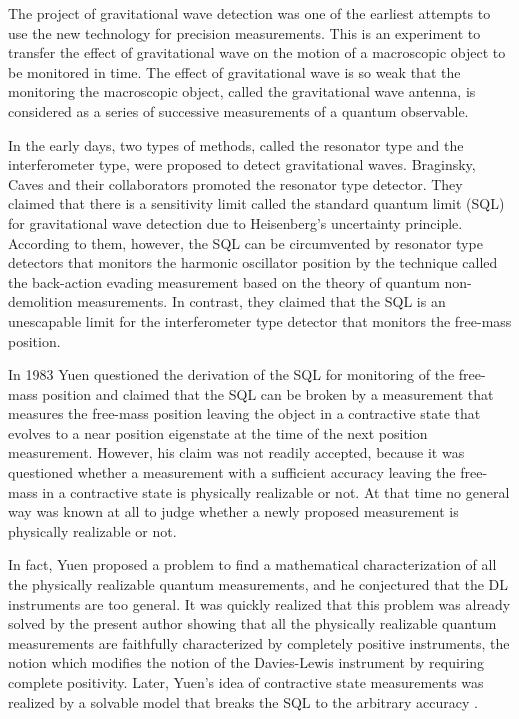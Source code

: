 \documentclass[graybox]{svmult}
\begin{document}
The project of gravitational wave detection was one of the earliest 
attempts to use the new technology for precision measurements.
This is an experiment to transfer the effect of gravitational wave 
on the motion of a macroscopic object to be monitored in time.
The effect of gravitational wave is so weak that the monitoring 
the macroscopic object, called the gravitational wave antenna, is
considered as a series of successive measurements of 
a quantum observable.

In the early days,  two types of methods, called the resonator type 
and the interferometer type, were proposed to detect gravitational waves.
Braginsky, Caves and their collaborators \cite{BVT80,CTDSZ80} promoted 
the resonator type detector.
They claimed that there is a sensitivity limit called the standard
quantum limit (SQL) for gravitational wave detection due to Heisenberg's
uncertainty principle.  According to them, however, the SQL can be circumvented 
by resonator type detectors that monitors the harmonic oscillator position
by the technique called the back-action evading measurement
based on the theory of quantum non-demolition measurements.
In contrast, they claimed that the SQL is an unescapable limit 
for the interferometer type detector that monitors the free-mass position.

In 1983 Yuen \cite{Yue83} questioned the derivation
of the SQL for monitoring of the free-mass position and claimed
that the SQL can be broken by a measurement 
that measures the free-mass position leaving the object in a
contractive state that evolves to a near position eigenstate 
at the time of the next position measurement.
However, his claim was not readily accepted, because it was questioned 
whether a measurement with a sufficient accuracy
leaving the free-mass in a contractive state is physically realizable or not.
At that time no general way was known at all to judge whether 
a newly proposed measurement is physically realizable or not.

In fact,  Yuen \cite{Yue87} proposed a problem to find a mathematical 
characterization of all the physically realizable quantum measurements,
and he conjectured that the DL instruments are too general.
It was quickly realized that this problem was already solved 
by the present author \cite{84QC} showing that all the physically realizable
quantum measurements are faithfully characterized by completely
positive instruments, the notion which modifies the notion of the
Davies-Lewis instrument by requiring complete positivity.
Later, Yuen's idea of contractive state measurements was realized 
by a solvable model that breaks the SQL to the arbitrary accuracy 
\cite{88MS,89RS,Mad88}.  
\end{document}
